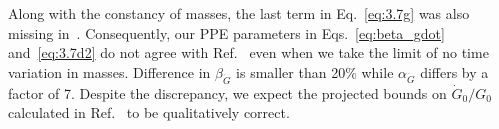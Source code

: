 \documentclass[prd,twocolumn,nofootinbib]{revtex4-1}
\begin{document}
Along with the constancy of masses, the last term in Eq.~\eqref{eq:3.7g} was also missing in~\cite{Yunes:2009bv}. Consequently, our PPE parameters in Eqs.~\eqref{eq:beta_gdot} and~\eqref{eq:3.7d2} do not agree with Ref.~\cite{Yunes:2009bv} even when we take the limit of no time variation in masses. Difference in $\beta_{\dot G}$ is smaller than 20\% while $\alpha_{\dot G}$ differs by a factor of 7. Despite the discrepancy, we expect the projected bounds on $\dot{G}_0/G_0$ calculated in Ref.~\cite{Yunes:2009bv} to be qualitatively correct.

%
%

\end{document}
